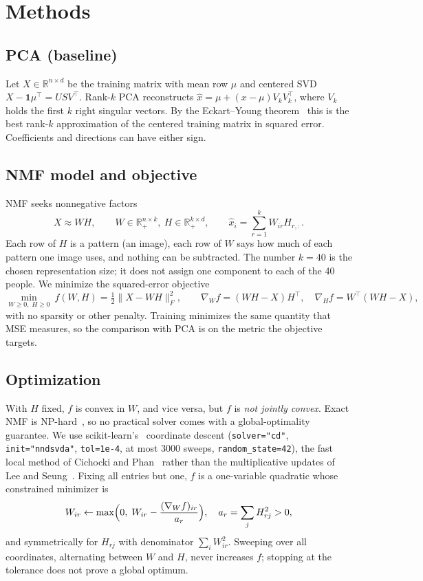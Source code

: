 \documentclass[10pt]{article}
\newcommand{\RR}{\mathbb{R}}
\begin{document}
\section{Methods}
\subsection{PCA (baseline)}
Let $X\in\RR^{n\times d}$ be the training matrix with mean row $\mu$ and centered SVD $X-\mathbf 1\mu^\top=USV^\top$. Rank-$k$ PCA reconstructs $\hat x=\mu+(x-\mu)V_kV_k^\top$, where $V_k$ holds the first $k$ right singular vectors. By the Eckart--Young theorem~\cite{eckart1936} this is the best rank-$k$ approximation of the centered training matrix in squared error. Coefficients and directions can have either sign.

\subsection{NMF model and objective}
NMF seeks nonnegative factors
\[
X\approx WH,\qquad W\in\RR_+^{n\times k},\ H\in\RR_+^{k\times d},\qquad \hat x_i=\sum_{r=1}^{k}W_{ir}H_{r,:}.
\]
Each row of $H$ is a pattern (an image), each row of $W$ says how much of each pattern one image uses, and nothing can be subtracted. The number $k=40$ is the chosen representation size; it does not assign one component to each of the 40 people. We minimize the squared-error objective~\cite{lee2001}
\[
\min_{W\ge0,\;H\ge0}\ f(W,H)=\tfrac12\|X-WH\|_F^2,\qquad \nabla_Wf=(WH-X)H^\top,\quad \nabla_Hf=W^\top(WH-X),
\]
with no sparsity or other penalty. Training minimizes the same quantity that MSE measures, so the comparison with PCA is on the metric the objective targets.

\subsection{Optimization}
With $H$ fixed, $f$ is convex in $W$, and vice versa, but $f$ is \emph{not jointly convex}. Exact NMF is NP-hard~\cite{vavasis2008}, so no practical solver comes with a global-optimality guarantee. We use scikit-learn's~\cite{pedregosa2011} coordinate descent (\texttt{solver="cd"}, \texttt{init="nndsvda"}, \texttt{tol=1e-4}, at most 3000 sweeps, \texttt{random\_state=42}), the fast local method of Cichocki and Phan~\cite{cichocki2009} rather than the multiplicative updates of Lee and Seung~\cite{lee2001}. Fixing all entries but one, $f$ is a one-variable quadratic whose constrained minimizer is
\[
W_{ir}\leftarrow\max\Bigl(0,\;W_{ir}-\frac{(\nabla_Wf)_{ir}}{a_r}\Bigr),\quad a_r=\sum_{j}H_{rj}^2>0,
\]
and symmetrically for $H_{rj}$ with denominator $\sum_iW_{ir}^2$. Sweeping over all coordinates, alternating between $W$ and $H$, never increases $f$; stopping at the tolerance does not prove a global optimum.
\end{document}
